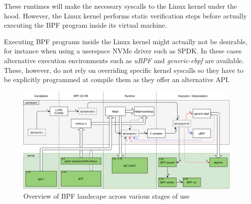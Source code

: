 \documentclass[conference]{IEEEtran}
\begin{document}
These runtimes will make the necessary syscalls to the Linux kernel under the
hood. However, the Linux kernel performs static verification steps before
actually executing the BPF program inside its virtual machine.

Executing BPF programs inside the Linux kernel might actually not be desirable,
for instance when using a userspace NVMe driver such as SPDK. In these cases
alternative execution environments such as \textit{uBPF} and
\textit{generic-ebpf} are available. These, however, do not rely on overriding
specific kernel syscalls so they have to be explicitly programmed at compile
them as they offer an alternative API.

\onecolumn

\begin{center}
	\begin{figure}[H]
		\includegraphics[width=1\textwidth]{resources/images/bpf-landscape.png}
		\captionsetup{justification=centering}
		\caption{Overview of BPF landscape across various stages of use}
		\label{fig:bpf-landscape}
	\end{figure}
\end{center}

\twocolumn


\end{document}
